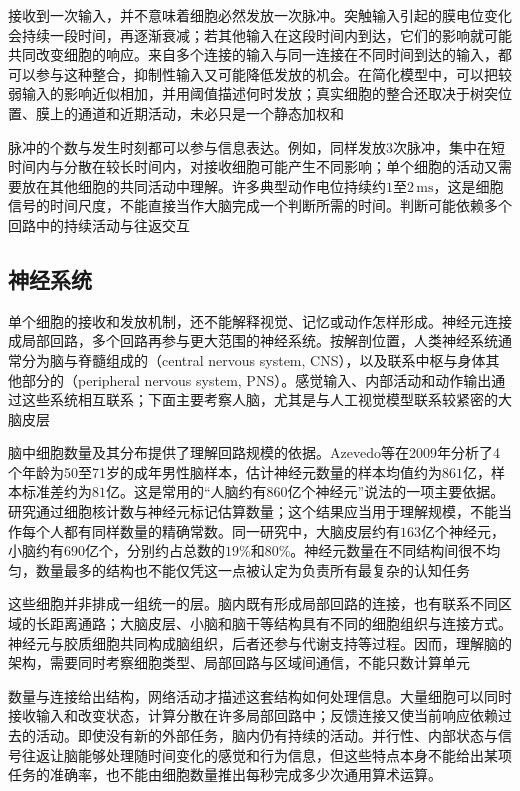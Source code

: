 接收到一次输入，并不意味着细胞必然发放一次脉冲。突触输入引起的膜电位变化会持续一段时间，再逐渐衰减；若其他输入在这段时间内到达，它们的影响就可能共同改变细胞的响应。来自多个连接的输入与同一连接在不同时间到达的输入，都可以参与这种整合，抑制性输入又可能降低发放的机会。在简化模型中，可以把较弱输入的影响近似相加，并用阈值描述何时发放；真实细胞的整合还取决于树突位置、膜上的通道和近期活动，未必只是一个静态加权和

脉冲的个数与发生时刻都可以参与信息表达。例如，同样发放3次脉冲，集中在短时间内与分散在较长时间内，对接收细胞可能产生不同影响；单个细胞的活动又需要放在其他细胞的共同活动中理解。许多典型动作电位持续约$1$至$2\,\mathrm{ms}$，这是细胞信号的时间尺度，不能直接当作大脑完成一个判断所需的时间。判断可能依赖多个回路中的持续活动与往返交互

\FloatBarrier
\subsection{神经系统}
\label{sec:neural-biological-system}

单个细胞的接收和发放机制，还不能解释视觉、记忆或动作怎样形成。神经元连接成局部回路，多个回路再参与更大范围的神经系统。按解剖位置，人类神经系统通常分为脑与脊髓组成的（central nervous system, CNS），以及联系中枢与身体其他部分的（peripheral nervous system, PNS）。感觉输入、内部活动和动作输出通过这些系统相互联系；下面主要考察人脑，尤其是与人工视觉模型联系较紧密的大脑皮层

脑中细胞数量及其分布提供了理解回路规模的依据。Azevedo等在2009年分析了4个年龄为50至71岁的成年男性脑样本，估计神经元数量的样本均值约为$861$亿，样本标准差约为$81$亿。这是常用的“人脑约有860亿个神经元”说法的一项主要依据。研究通过细胞核计数与神经元标记估算数量；这个结果应当用于理解规模，不能当作每个人都有同样数量的精确常数。同一研究中，大脑皮层约有$163$亿个神经元，小脑约有$690$亿个，分别约占总数的$19\%$和$80\%$。神经元数量在不同结构间很不均匀，数量最多的结构也不能仅凭这一点被认定为负责所有最复杂的认知任务

这些细胞并非排成一组统一的层。脑内既有形成局部回路的连接，也有联系不同区域的长距离通路；大脑皮层、小脑和脑干等结构具有不同的细胞组织与连接方式。神经元与胶质细胞共同构成脑组织，后者还参与代谢支持等过程。因而，理解脑的架构，需要同时考察细胞类型、局部回路与区域间通信，不能只数计算单元

数量与连接给出结构，网络活动才描述这套结构如何处理信息。大量细胞可以同时接收输入和改变状态，计算分散在许多局部回路中；反馈连接又使当前响应依赖过去的活动。即使没有新的外部任务，脑内仍有持续的活动。并行性、内部状态与信号往返让脑能够处理随时间变化的感觉和行为信息，但这些特点本身不能给出某项任务的准确率，也不能由细胞数量推出每秒完成多少次通用算术运算。

